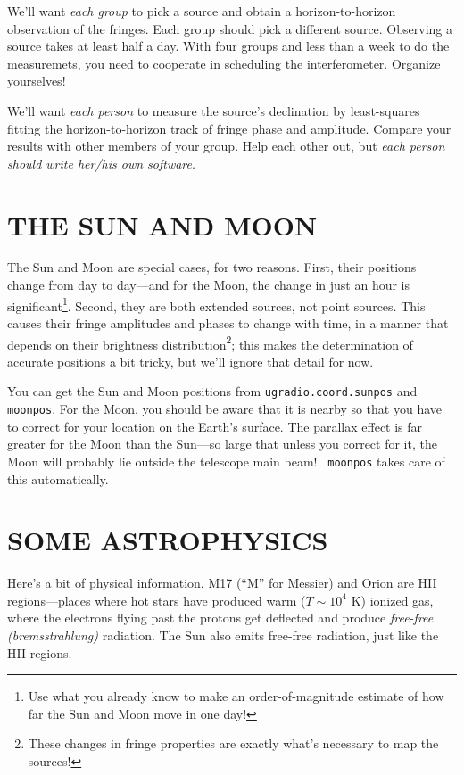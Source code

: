 \documentclass[11pt,preprint]{aastex}
\begin{document}
We'll want {\it each group} to pick a source and obtain a
horizon-to-horizon observation of the fringes. Each group should pick a
different source. Observing a source takes at least half a day. With
four groups and less than a week to do the measuremets, you need to
cooperate in scheduling the interferometer. Organize yourselves!

We'll want {\it each person} to measure the source's
declination by least-squares fitting the horizon-to-horizon track of
fringe phase and amplitude.  Compare your results with other members of
your group.  Help each other out, but {\it each person should write
  her/his own software}.

\section{THE SUN AND MOON}

	The Sun and Moon are special cases, for two reasons. First, 
their positions change from day to day---and for the Moon, the change in
just an hour is significant\footnote{Use what you already know to make
an order-of-magnitude estimate of how far the Sun and Moon move in one
day!}.  Second, they are both extended sources, not point sources. This
causes their fringe amplitudes and phases to change with time, in a
manner that depends on their brightness distribution\footnote{These
changes in fringe properties are exactly what's necessary to map the
sources!}; this makes the determination of accurate positions a bit
tricky, but we'll ignore that detail for now.

	You can get the Sun and Moon positions from 
        {\tt ugradio.coord.sunpos} and {\tt moonpos}.  For the Moon, you should be aware
        that it is nearby so that you have to correct for your location
        on the Earth's surface. The parallax effect is far greater for
        the Moon than the Sun---so large that unless you correct for it,
        the Moon will probably lie outside the telescope main beam! {\tt
          moonpos} takes care of this automatically.

\section{SOME ASTROPHYSICS}

Here's a bit of physical information.  M17 (``M'' for Messier) and Orion
are HII regions---places where hot stars have produced warm ($T \sim
10^4$ K) ionized gas, where the electrons flying past the protons get
deflected and produce {\it free-free (bremsstrahlung)} radiation.  The
Sun also emits free-free radiation, just like the HII regions.
\end{document}
